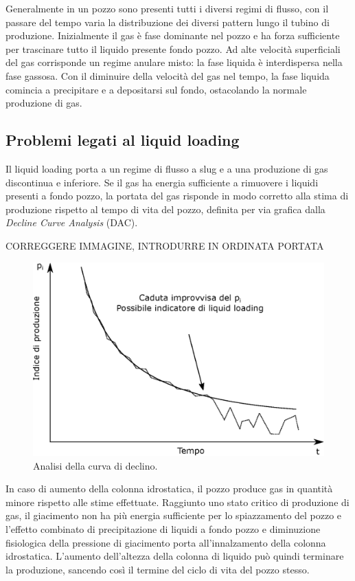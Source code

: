 Generalmente in un pozzo sono presenti tutti i diversi regimi di flusso, con il passare del tempo varia la distribuzione dei diversi pattern lungo il tubino di produzione. Inizialmente il gas è fase dominante nel pozzo e ha forza sufficiente per trascinare tutto il liquido presente fondo pozzo. Ad alte velocità superficiali del gas corrisponde un regime anulare misto: la fase liquida è interdispersa nella fase gassosa. Con il diminuire della velocità del gas nel tempo, la fase liquida comincia a precipitare e a depositarsi sul fondo, ostacolando la normale produzione di gas.

\subsection{Problemi legati al liquid loading}
Il liquid loading porta a un regime di flusso a slug e a una produzione di gas discontinua e inferiore. Se il gas ha energia sufficiente a rimuovere i liquidi presenti a fondo pozzo, la portata del gas risponde in modo corretto alla stima di produzione rispetto al tempo di vita del pozzo, definita per via grafica dalla \textit{Decline Curve Analysis} (DAC).

CORREGGERE IMMAGINE, INTRODURRE IN ORDINATA PORTATA
\begin{figure}[htbp]
    \centering
    \includegraphics[width=.8\textwidth]{fig/foamer/declinecurve.eps}
    \caption{Analisi della curva di declino.}
    \label{fig:ipr}
\end{figure}

In caso di aumento della colonna idrostatica, il pozzo produce gas in quantità minore rispetto alle stime effettuate. Raggiunto uno stato critico di produzione di gas, il giacimento non ha più energia sufficiente per lo spiazzamento del pozzo e l'effetto combinato di precipitazione di liquidi a fondo pozzo e diminuzione fisiologica della pressione di giacimento porta all'innalzamento della colonna idrostatica. L'aumento dell'altezza della colonna di liquido può quindi terminare la produzione, sancendo così il termine del ciclo di vita del pozzo stesso.
 
